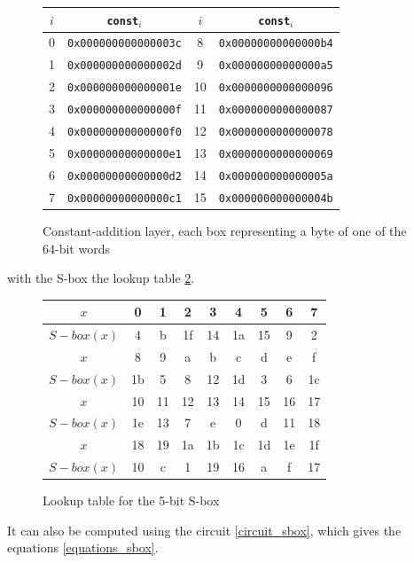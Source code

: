 \documentclass[12pt]{article}
\begin{document}
	\begin{figure}[h]
		\centering
		\footnotesize
		\begin{tabularx}{0.5\textwidth}{cc||cc}
			\hline
			$i$&\verb|const|$_i$&$i$&\verb|const|$_i$\\
			\hline
			0&\verb|0x000000000000003c|&8&\verb|0x00000000000000b4|\\
			1&\verb|0x000000000000002d|&9&\verb|0x00000000000000a5|\\
			2&\verb|0x000000000000001e|&10&\verb|0x0000000000000096|\\
			3&\verb|0x000000000000000f|&11&\verb|0x0000000000000087|\\
			4&\verb|0x00000000000000f0|&12&\verb|0x0000000000000078|\\
			5&\verb|0x00000000000000e1|&13&\verb|0x0000000000000069|\\
			6&\verb|0x00000000000000d2|&14&\verb|0x000000000000005a|\\
			7&\verb|0x00000000000000c1|&15&\verb|0x000000000000004b|\\
			\hline
		\end{tabularx}
		\caption{Constant-addition layer, each box representing a byte of one of the 64-bit words{}}
		\label{consts}
	\end{figure} 	
	
	
	with the S-box the lookup table \ref{lookup_sbox}.
	
	\begin{figure}[h]
		\small
		\centering
		\begin{tabular}{|c||*{8}{c|}}
			\hline
			$x$&0&1&2&3&4&5&6&7\\
			\hline
			$S-box(x)$&4&b&1f&14&1a&15&9&2\\
			\hline\hline
			$x$&8&9&a&b&c&d&e&f\\
			\hline
			$S-box(x)$&1b&5&8&12&1d&3&6&1c\\
			\hline\hline
			$x$&10&11&12&13&14&15&16&17\\
			\hline
			$S-box(x)$&1e&13&7&e&0&d&11&18\\
			\hline\hline
			$x$&18&19&1a&1b&1c&1d&1e&1f\\
			\hline
			$S-box(x)$&10&c&1&19&16&a&f&17\\
			\hline
		\end{tabular}
		\caption{Lookup table for the 5-bit S-box}
		\label{lookup_sbox}
	\end{figure}
	
	It can also be computed using the circuit \ref{circuit_sbox}, which gives the equations \ref{equations_sbox}.
	
\end{document}
